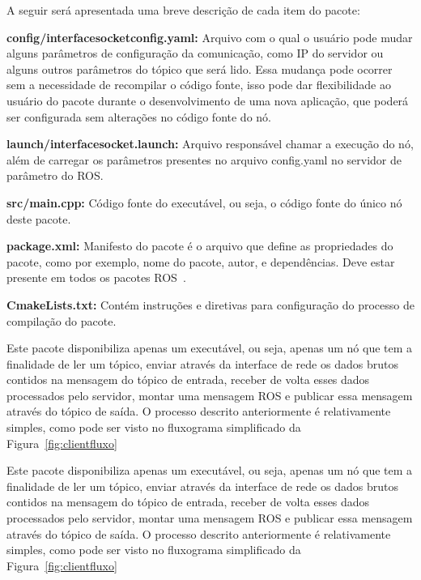 A seguir será apresentada uma breve descrição de cada item do pacote:
 
\textbf{config/interface\underline{\hspace{.07in}}socket\underline{\hspace{.07in}}config.yaml:} Arquivo com o qual o usuário pode mudar alguns parâmetros de configuração da comunicação, como IP do servidor ou alguns outros parâmetros do tópico que será lido. Essa mudança pode ocorrer sem a necessidade de recompilar o código fonte, isso pode dar flexibilidade ao usuário do pacote durante o desenvolvimento de uma nova aplicação, que poderá ser configurada sem alterações no código fonte do nó. 

\textbf{launch/interface\underline{\hspace{.07in}}socket.launch:} Arquivo responsável chamar a execução do nó, além de carregar os parâmetros presentes no arquivo config.yaml no servidor de parâmetro do ROS\@.

\textbf{src/main.cpp:} Código fonte do executável, ou seja, o código fonte do único nó deste pacote.

\textbf{package.xml:} Manifesto do pacote é o arquivo que define as propriedades do pacote, como por exemplo, nome do pacote, autor, e dependências. Deve estar presente em todos os pacotes ROS~\cite{RosPkgXml}.


\textbf{CmakeLists.txt:} Contém instruções e diretivas para configuração do processo de compilação do pacote.

Este pacote disponibiliza apenas um executável, ou seja, apenas um nó que tem a finalidade de ler um tópico, enviar através da interface de rede os dados brutos contidos na mensagem do tópico de entrada, receber de volta esses dados processados pelo servidor, montar uma mensagem ROS e publicar essa mensagem através do tópico de saída. O processo descrito anteriormente é relativamente simples, como pode ser visto no fluxograma simplificado da Figura~\ref{fig:clientfluxo}

Este pacote disponibiliza apenas um executável, ou seja, apenas um nó que tem a finalidade de ler um tópico, enviar através da interface de rede os dados brutos contidos na mensagem do tópico de entrada, receber de volta esses dados processados pelo servidor, montar uma mensagem ROS e publicar essa mensagem através do tópico de saída. O processo descrito anteriormente é relativamente simples, como pode ser visto no fluxograma simplificado da Figura~\ref{fig:clientfluxo}

